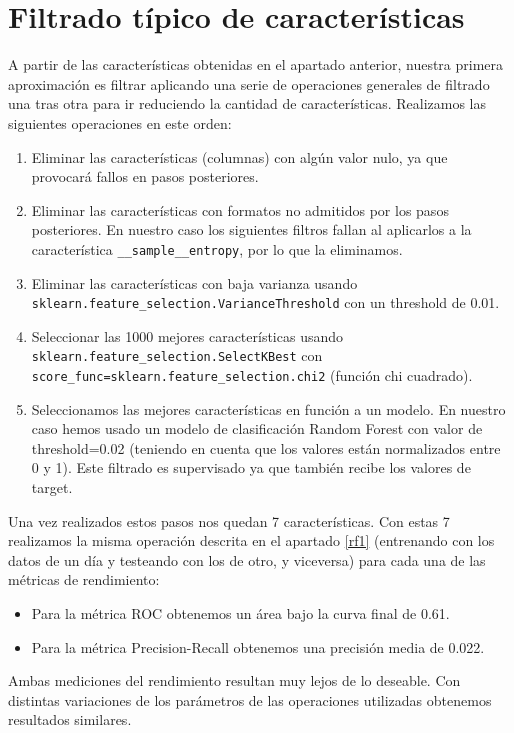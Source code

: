 \documentclass[a4paper,12pt,twoside,oldfontcommands]{memoir}
\begin{document}
\section{Filtrado típico de características}

A partir de las características obtenidas en el apartado anterior, nuestra primera aproximación es filtrar aplicando una serie de operaciones generales de filtrado una tras otra para ir reduciendo la cantidad de características. Realizamos las siguientes operaciones en este orden: 
\begin{enumerate}
    \item Eliminar las características (columnas) con algún valor nulo, ya que provocará fallos en pasos posteriores. 
    \item Eliminar las características con formatos no admitidos por los pasos posteriores. En nuestro caso los siguientes filtros fallan al aplicarlos a la característica \texttt{\_\_sample\_\_entropy}, por lo que la eliminamos. 
    \item Eliminar las características con baja varianza usando \texttt{sklearn.feature\_selection.VarianceThreshold} con un threshold de 0.01. 
    \item Seleccionar las 1000 mejores características usando \texttt{sklearn.feature\_selection.SelectKBest} con \texttt{score\_func=sklearn.feature\_selection.chi2} (función chi cuadrado). 
    \item Seleccionamos las mejores características en función a un modelo. En nuestro caso hemos usado un modelo de clasificación Random Forest con valor de threshold=0.02 (teniendo en cuenta que los valores están normalizados entre 0 y 1). Este filtrado es supervisado ya que también recibe los valores de target. 
\end{enumerate}
Una vez realizados estos pasos nos quedan 7 características. Con estas 7 realizamos la misma operación descrita en el apartado \ref{rf1} (entrenando con los datos de un día y testeando con los de otro, y viceversa) para cada una de las métricas de rendimiento: 

\begin{itemize}
    \item Para la métrica ROC obtenemos un área bajo la curva final de 0.61. 
    \item Para la métrica Precision-Recall obtenemos una precisión media de 0.022.
\end{itemize}

Ambas mediciones del rendimiento resultan muy lejos de lo deseable. Con distintas variaciones de los parámetros de las operaciones utilizadas obtenemos resultados similares.
\end{document}
